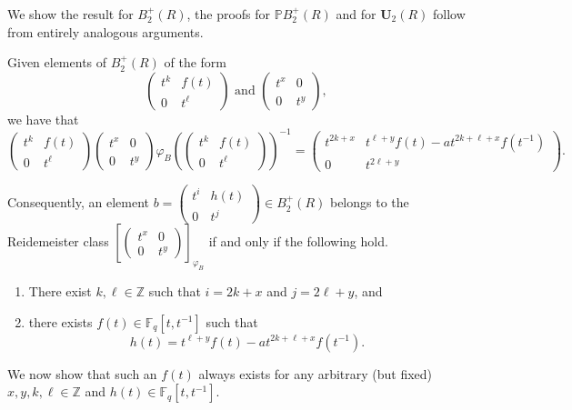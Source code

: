 \documentclass[a4paper,11pt]{amsart}
\makeatletter
\numberwithin{equation}{section}
\theoremstyle{plain}
\theoremstyle{definition}
\renewenvironment{proof}[1][\proofname] {\par\pushQED{\qed}\normalfont\topsep6\p@\@plus6\p@\relax\trivlist\item[\hskip\labelsep\bfseries#1\@addpunct{.}]\ignorespaces}{\popQED\endtrivlist\@endpefalse}
\newcommand{\Z}{\mathbb{Z}}
\newcommand{\F}{\mathbb{F}}
\newcommand{\mbU}{\mathbf{U}} %
\newcommand{\PBplus}{\mathbb{P}B^{+}} %
\newcommand{\phee}{\varphi} %
\makeatother
\begin{document}
\begin{proof} We show the result for $B_{2}^{+}(R)$, the proofs for $\PBplus_2(R)$ and for $\mbU_2(R)$ follow from entirely analogous arguments. 

Given elements of $B_{2}^{+}(R)$ of the form 
\[\left(\begin{smallmatrix} t^{k}&f(t)\\0&t^{\ell}\end{smallmatrix}\right)\text{ and }\left(\begin{smallmatrix} t^{x}&0\phantom{|}\\0&t^{y}\end{smallmatrix}\right),\] 
we have that 
\[ \left(\begin{smallmatrix} t^{k}&f(t)\\0&t^{\ell}\end{smallmatrix}\right)\left(\begin{smallmatrix} t^{x}&0\phantom{|}\\0&t^{y}\end{smallmatrix}\right)\phee_{B}\left(\left(\begin{smallmatrix} t^{k}&f(t)\\0&t^{\ell}\end{smallmatrix}\right)\right)^{-1} = \left(\begin{smallmatrix} t^{2k+x}&t^{\ell+y}f(t)-at^{2k+\ell+x}f(t^{-1})\\0&t^{2\ell+y}\end{smallmatrix}\right).\]

Consequently, an element $b=\left(\begin{smallmatrix} t^{i}&h(t)\\0&t^{j}\end{smallmatrix}\right) \in B_{2}^{+}(R)$ 
belongs to the Reidemeister class $\left[\left(\begin{smallmatrix} t^{x}&0\\0&t^{y}\end{smallmatrix}\right)\right]_{\phee_B}$ if and only if the following hold.
\begin{enumerate}
    \item There exist $k,\ell \in \Z$ such that $i = 2k+x$ and $j = 2\ell+y$, and
    \item there exists $f(t) \in \F_q[t,t^{-1}]$ such that 
    \begin{equation}
\label{eq:hf}h(t)=t^{\ell+y}f(t)-at^{2k+\ell+x}f(t^{-1}).
\end{equation}
\end{enumerate}
We now show that such an $f(t)$ always exists for any arbitrary (but fixed) $x,y,k,\ell \in \Z$ and $h(t) \in \F_q[t,t^{-1}]$.


\end{proof}
\end{document}
